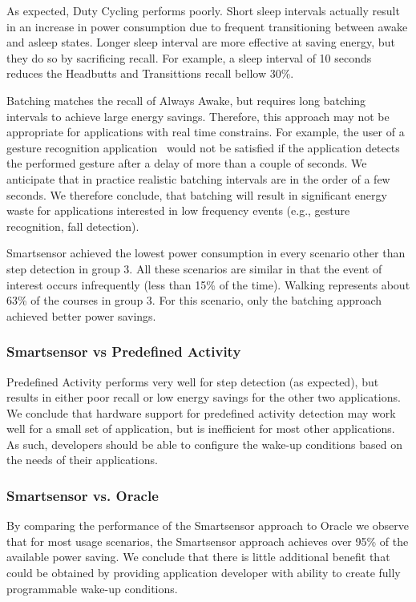 As expected, Duty Cycling performs poorly.  Short sleep intervals
actually result in an increase in power consumption due to frequent
transitioning between awake and asleep states.  Longer sleep interval
are more effective at saving energy, but they do so by sacrificing
recall.  For example, a sleep interval of 10 seconds reduces the
Headbutts and Transittions recall bellow 30\%.

Batching matches the recall of Always Awake, but requires long
batching intervals to achieve large energy savings.  Therefore, this
approach may not be appropriate for applications with real time
constrains.  For example, the user of a gesture recognition
application~\cite{liu2009uwave,schlomer2008gesture} would not be
satisfied if the application detects the performed gesture after a
delay of more than a couple of seconds.  We anticipate that in
practice realistic batching intervals are in the order of a few
seconds.  We therefore conclude, that batching will result in
significant energy waste for applications interested in low frequency
events (e.g., gesture recognition, fall detection).

Smartsensor achieved the lowest power consumption in every scenario
other than step detection in group 3. All these scenarios are similar
in that the event of interest occurs infrequently (less than 15\% of
the time). Walking represents about 63\% of the courses in group 3.
For this scenario, only the batching approach achieved better power
savings.


\subsubsection{Smartsensor vs Predefined Activity}

Predefined Activity performs very well for step detection (as
expected), but results in either poor recall or low energy savings for
the other two applications.  We conclude that hardware support for
predefined activity detection may work well for a small set of
application, but is inefficient for most other applications. As such,
developers should be able to configure the wake-up conditions based on
the needs of their applications.

\subsubsection{Smartsensor vs. Oracle}

By comparing the performance of the Smartsensor approach to Oracle we
observe that for most usage scenarios, the Smartsensor approach
achieves over 95\% of the available power saving.  We conclude that
there is little additional benefit that could be obtained by providing
application developer with ability to create fully programmable
wake-up conditions.


